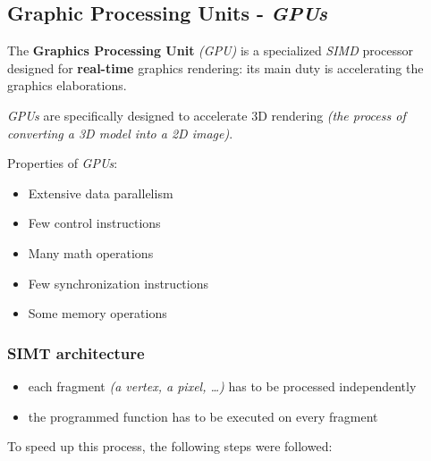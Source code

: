\documentclass[english]{article}
\begin{document}
\subsection{Graphic Processing Units - \textit{GPUs}}

The \textbf{Graphics Processing Unit} \textit{(GPU)} is a specialized \textit{SIMD} processor designed for \textbf{real-time} graphics rendering: its main duty is accelerating the graphics elaborations.

\textit{GPUs} are specifically designed to accelerate 3D rendering \textit{(the process of converting a 3D model into a 2D image)}.

Properties of \textit{GPUs}:

\begin{itemize}
  \item Extensive data parallelism
  \item Few control instructions
  \item Many math operations
  \item Few synchronization instructions
  \item Some memory operations
\end{itemize}

\subsubsection{SIMT architecture}

\begin{itemize}
  \item each fragment \textit{(a vertex, a pixel, \ldots)} has to be processed independently
  \item the programmed function has to be executed on every fragment
\end{itemize}

To speed up this process, the following steps were followed:
\end{document}
